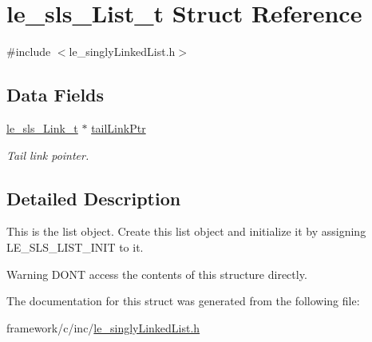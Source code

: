 \hypertarget{structle__sls___list__t}{}\section{le\+\_\+sls\+\_\+\+List\+\_\+t Struct Reference}
\label{structle__sls___list__t}


{\ttfamily \#include $<$le\+\_\+singly\+Linked\+List.\+h$>$}

\subsection*{Data Fields}
\begin{DoxyCompactItemize}
\item 
\hypertarget{structle__sls___list__t_a696f83142673b69689c6dcf750a09e4a}{}\hyperlink{structle__sls___link__t}{le\+\_\+sls\+\_\+\+Link\+\_\+t} $\ast$ \hyperlink{structle__sls___list__t_a696f83142673b69689c6dcf750a09e4a}{tail\+Link\+Ptr}\label{structle__sls___list__t_a696f83142673b69689c6dcf750a09e4a}

\begin{DoxyCompactList}\small\item\em Tail link pointer. \end{DoxyCompactList}\end{DoxyCompactItemize}


\subsection{Detailed Description}
This is the list object. Create this list object and initialize it by assigning L\+E\+\_\+\+S\+L\+S\+\_\+\+L\+I\+S\+T\+\_\+\+I\+N\+I\+T to it.

\begin{DoxyWarning}{Warning}
D\+O\+N\textquotesingle{}T access the contents of this structure directly. 
\end{DoxyWarning}


The documentation for this struct was generated from the following file\+:\begin{DoxyCompactItemize}
\item 
framework/c/inc/\hyperlink{le__singly_linked_list_8h}{le\+\_\+singly\+Linked\+List.\+h}\end{DoxyCompactItemize}
